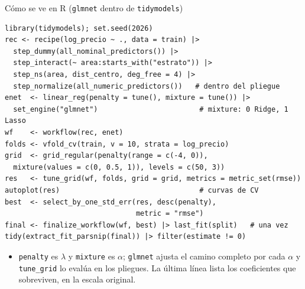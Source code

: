 \documentclass{beamer}
\newcommand{\1}{\mathbb{I}}
\begin{document}
\begin{frame}[fragile]{Cómo se ve en R (\texttt{glmnet} dentro de \texttt{tidymodels})}
\scriptsize
\begin{verbatim}
library(tidymodels); set.seed(2026)
rec <- recipe(log_precio ~ ., data = train) |>
  step_dummy(all_nominal_predictors()) |>
  step_interact(~ area:starts_with("estrato")) |>
  step_ns(area, dist_centro, deg_free = 4) |>
  step_normalize(all_numeric_predictors())   # dentro del pliegue
enet  <- linear_reg(penalty = tune(), mixture = tune()) |>
  set_engine("glmnet")                        # mixture: 0 Ridge, 1 Lasso
wf    <- workflow(rec, enet)
folds <- vfold_cv(train, v = 10, strata = log_precio)
grid  <- grid_regular(penalty(range = c(-4, 0)),
  mixture(values = c(0, 0.5, 1)), levels = c(50, 3))
res   <- tune_grid(wf, folds, grid = grid, metrics = metric_set(rmse))
autoplot(res)                                 # curvas de CV
best  <- select_by_one_std_err(res, desc(penalty),
                               metric = "rmse")
final <- finalize_workflow(wf, best) |> last_fit(split)   # una vez
tidy(extract_fit_parsnip(final)) |> filter(estimate != 0)
\end{verbatim}
\normalsize
\small
\begin{itemize}\itemsep2pt
  \item \texttt{penalty} es $\lambda$ y \texttt{mixture} es $\alpha$; \texttt{glmnet} ajusta el camino completo por cada $\alpha$ y \texttt{tune\_grid} lo evalúa en los pliegues. La última línea lista los coeficientes que sobreviven, en la escala original.
\end{itemize}
\end{frame}
\end{document}
